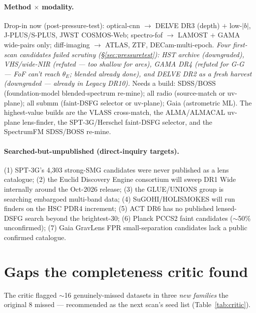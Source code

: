 \documentclass[11pt,letterpaper]{article}
\begin{document}
\paragraph{Method $\times$ modality.} Drop-in now (post-pressure-test): optical-cnn $\to$ DELVE DR3
(depth) $+$ low-$|b|$, J-PLUS/S-PLUS, JWST COSMOS-Web; spectro-fof $\to$ LAMOST $+$ GAMA wide-pairs
only; diff-imaging $\to$ ATLAS, ZTF, DECam-multi-epoch. \emph{Four first-scan candidates failed
scrutiny (\S\ref{sec:pressuretest}): HST archive (downgraded), VHS/wide-NIR (refuted --- too shallow
for arcs), GAMA DR4 (refuted for G-G --- FoF can't reach $\theta_E$; blended already done), and
DELVE DR2 as a fresh harvest (downgraded --- already in Legacy DR10).} Needs a build: SDSS/BOSS
(foundation-model blended-spectrum re-mine); all radio (source-match or uv-plane); all submm
(faint-DSFG selector or uv-plane); Gaia (astrometric ML). The highest-value builds are the VLASS
cross-match, the
ALMA/ALMACAL uv-plane lens-finder, the SPT-3G/Herschel faint-DSFG selector, and the SpectrumFM
SDSS/BOSS re-mine.

\paragraph{Searched-but-unpublished (direct-inquiry targets).} (1) SPT-3G's 4{,}303 strong-SMG
candidates \citep{archipley2024} were never published as a lens catalogue; (2) the Euclid
Discovery Engine consortium will sweep DR1 Wide internally around the Oct-2026 release;
(3) the GLUE/UNIONS group is searching embargoed multi-band data; (4) SuGOHI/HOLISMOKES will run
finders on the HSC PDR4 increment; (5) ACT DR6 has no published lensed-DSFG search beyond the
brightest-30; (6) Planck PCCS2 faint candidates ($\sim$50\% unconfirmed); (7) Gaia GravLens FPR
small-separation candidates lack a public confirmed catalogue.

\section{Gaps the completeness critic found}
The critic flagged $\sim$16 genuinely-missed datasets in three \emph{new families} the original
8 missed --- recommended as the next scan's seed list (Table~\ref{tab:critic}).
\end{document}
